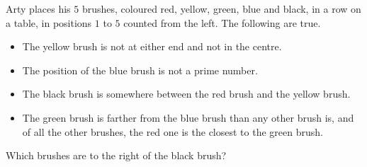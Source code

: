 Arty places his $5$ brushes, coloured red, yellow, green, blue and black, in a row on a table, in positions $1$ to $5$ counted from the left. The following are true.
\begin{itemize}
\item The yellow brush is not at either end and not in the centre.
\item The position of the blue brush is not a prime number.
\item The black brush is somewhere between the red brush and the yellow brush.
\item The green brush is farther from the blue brush than any other brush is, and of all the other brushes, the red one is the closest to the green brush.
\end{itemize}
Which brushes are to the right of the black brush?
